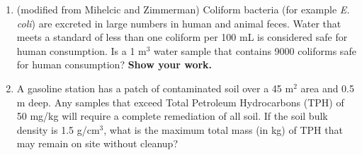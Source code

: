 \documentclass[12pt,letterpaper]{article}
\begin{document}
\begin{enumerate}
\item (modified from Mihelcic and Zimmerman) Coliform bacteria (for example \emph{E. coli}) are excreted in large numbers in human and animal feces.  Water that meets a standard of less than one coliform per 100 mL is considered safe for human consumption.  Is a 1 m$^3$ water sample that contains 9000 coliforms safe for human consumption?  \textbf{Show your work.}

\item A gasoline station has a patch of contaminated soil over a 45 m$^2$ area and 0.5 m deep. Any samples that exceed Total Petroleum Hydrocarbons (TPH) of 50 mg/kg will require a complete remediation of all soil. If the soil bulk density is 1.5 g/cm$^3$, what is the maximum total mass (in kg) of TPH that may remain on site without cleanup?


\end{enumerate}
\end{document}
